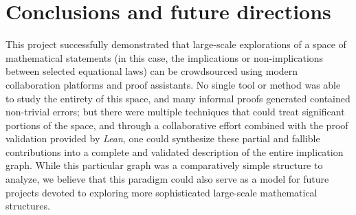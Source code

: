 \section{Conclusions and future directions}

This project successfully demonstrated that large-scale explorations of a space of mathematical statements (in this case, the implications or non-implications between selected equational laws) can be crowdsourced using modern collaboration platforms and proof assistants.  No single tool or method was able to study the entirety of this space, and many informal proofs generated contained non-trivial errors; but there were multiple techniques that could treat significant portions of the space, and through a collaborative effort combined with the proof validation provided by \emph{Lean}, one could synthesize these partial and fallible contributions into a complete and validated description of the entire implication graph.  While this particular graph was a comparatively simple structure to analyze, we believe that this paradigm could also serve as a model for future projects devoted to exploring more sophisticated large-scale mathematical structures.

